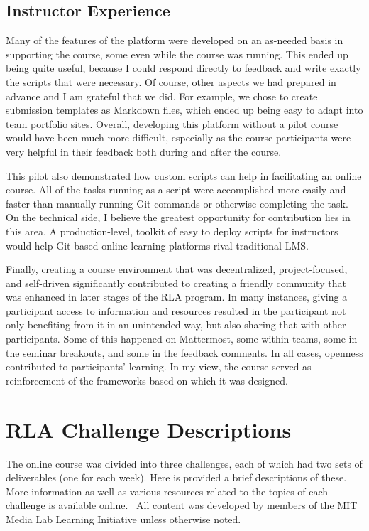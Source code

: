 \documentclass[12pt,twoside]{mitthesis}
\begin{document}
{\section{Instructor Experience}

Many of the features of the platform were developed on an as-needed basis in supporting the course, some even while the course was running. This ended up being quite useful, because I could respond directly to feedback and write exactly the scripts that were necessary. Of course, other aspects we had prepared in advance and I am grateful that we did. For example, we chose to create submission templates as Markdown files, which ended up being easy to adapt into team portfolio sites. Overall, developing this platform without a pilot course would have been much more difficult, especially as the course participants were very helpful in their feedback both during and after the course.

This pilot also demonstrated how custom scripts can help in facilitating an online course. All of the tasks running as a script were accomplished more easily and faster than manually running Git commands or otherwise completing the task. On the technical side, I believe the greatest opportunity for contribution lies in this area. A production-level, toolkit of easy to deploy scripts for instructors would help Git-based online learning platforms rival traditional LMS.

Finally, creating a course environment that was decentralized, project-focused, and self-driven significantly contributed to creating a friendly community that was enhanced in later stages of the RLA program. In many instances, giving a participant access to information and resources resulted in the participant not only benefiting from it in an unintended way, but also sharing that with other participants. Some of this happened on Mattermost, some within teams, some in the seminar breakouts, and some in the feedback comments. In all cases, openness contributed to participants' learning. In my view, the course served as reinforcement of the frameworks based on which it was designed.}

\appendix

\chapter{RLA Challenge Descriptions}

The online course was divided into three challenges, each of which had two sets of deliverables (one for each week). Here is provided a brief descriptions of these. More information as well as various resources related to the topics of each challenge is available online.~\cite{rla} All content was developed by members of the MIT Media Lab Learning Initiative unless otherwise noted.
\end{document}
